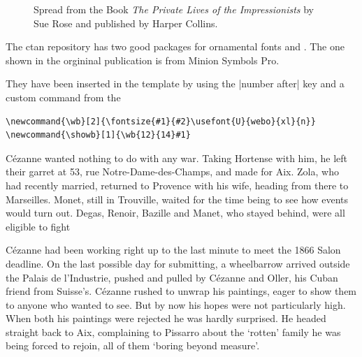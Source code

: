 \begin{figure}[ht]
\centering
{}
\caption{Spread from the Book \emph{The Private Lives of the Impressionists} by Sue Rose and published by Harper Collins.}
\end{figure}

The ctan repository has two good packages for ornamental fonts  and . The one shown in the orgininal publication is from Minion Symbols Pro.

They have been inserted in the template by using the |number after| key and a custom command from the 
\bigskip

\begin{scriptexample}{}{}
\begin{verbatim}
\newcommand{\wb}[2]{\fontsize{#1}{#2}\usefont{U}{webo}{xl}{n}}
\newcommand{\showb}[1]{\wb{12}{14}#1}
\end{verbatim}
\end{scriptexample}


\ornament

\let\oldsection\section
\long\def\section{%
\par\medskip
\addvspace{20pt}
\centerline{{\LARGE *}}%
\addvspace{20pt}}


Cézanne wanted nothing to do with any war. Taking Hortense with him,
he left their garret at 53, rue Notre-Dame-des-Champs, and made for Aix.
Zola, who had recently married, returned to Provence with his wife,
heading from there to Marseilles. Monet, still in Trouville, waited for the
time being to see how events would turn out. Degas, Renoir, Bazille and
Manet, who stayed behind, were all eligible to fight

Cézanne had been working right up to the last minute to meet the 1866
Salon deadline. On the last possible day for submitting, a wheelbarrow
arrived outside the Palais de l’Industrie, pushed and pulled by Cézanne
and Oller, his Cuban friend from Suisse’s. Cézanne rushed to unwrap his
paintings, eager to show them to anyone who wanted to see. But by now
his hopes were not particularly high. When both his paintings were
rejected he was hardly surprised. He headed straight back to Aix,
complaining to Pissarro about the ‘rotten’ family he was being forced to
rejoin, all of them ‘boring beyond measure’. 

